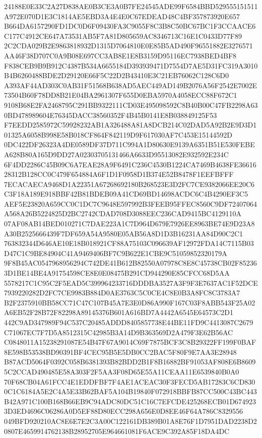 \documentclass[UTF8,fontset=fandol,zihao=-4,a4paper]{ctexart}
\begin{document}
{{24188E0E33C2A27D838AE0B3CE3A0B7FE24545ADE99F6584BBD529555151511A972E070D1E3C1814AE5EBD3A4E4E0C67EDEAD48C4BF357873920E657
B664DA6157290FD1DC0D6F09430FA3C9055F8C3B8C50BC67BC1F3CCAACE6C177C4912CE647A73531AB5F7A81D805659AC8346713C16E1C0433D77F89
2C2CDA029B2E9863818932D1315D7064810E0E85B5AD490F96551882E3276571AA46F38D707C0A9B08E697CC3AB8E1E8B3159D95116EC7938BED4BF8
F838CEB9B9B912C4387B534A6655184D393939471D7554D7AE5D31FC319A3010B4B6260488BDE2D29120E66F5C22D2B43410E3C21EB76062C128C6D0
A393AF44AD303C0AB31F51568B638AD5AEC449AD149B2076A56F2542E7002E73504B60F78DD8B21E04BA2961307F655D0EBA5970A4058ECC88F672C1
9108B68E2FA2468795C291BB9322111CD03E495098592C8B40B00C47FB2298A630BD478989604E76345DACC38560352F4B45B0141E8B038849125F53
F7EEDD2585972C59928232AB1A326488A81A8DCB214C02DAD5A92B2E9D3D101325A6058B998E58B018CF864F842119D9F617030AF7C453E15144592D
0DC422DF26323A4DE0589DF37D711C994A1D80630E9139A6351B51E530FEBEA628B80A165D9DD27A02303705131466A6633D95513082E932592E234C
6F4DD2286C45B09C6A7EAE28A9F6491C236C4530B1224CA7469B4638FE3661628312B128CC0C479F654884A6F1D1F0958D1B374E52B8478F1EEFBFFF
7ECACAECA9468D1A22351A67268692180B268523E3D2FC7CE9382066EE20C6C3F18A189E918BBF42B81BDEB09A41CD69BD14698ACDC6C4B4290EF3C5
AEF5E23820A659CC0C1DC7C9648E597992B3FEEB95FFEC8560C9DF72407064A568A26B5224825D2BC2742CDAD708D3088EEC236CAD9415BC4129110A
07AF08AB14BED010271C7DAE223A1C7D964D679E7926EE8963BE74E9D23A8A30B2525666439F7DF659A54A9580E05AB56A8D1D3B16231AA84D90C2C1
763832344D646AE10E18B018921CF88A75103C096639AF12972FDA14C7115B03D47C1C9BE84904C41A9469406BF7C9B622E1CBE9C51059852320179A
9F8B45AC0547968956294C742DE41B612B82550A07978C8E8C45738CB02F852363D1BE14BE4A91754598CE8E0E08475B291CD944290E85CFCC68D5AA
5578217C1C95C2F5EAD5C399964233716DDDBA3527A3F9F3E7637AC1F52DCE7939220282D2FC7CE9983B884D0AE3763C5C0CE4C8E0B3A8FC8C3783A7
B2F2375910BB58CC71C47C107B45A7E3E0D86A990F167C03F8ABB543F25A02A6EB52F28B72F82298A89145376B601A616BD7A4442A6545E64573C2D1
442C9AD347989F94C537C20485ADDD8405857738E44BE11FD9C4413087C2679C71067EC7F7D5A8512315C42985B3A14D9B363569D2A479F3E62B56AC
C0848011A15238291087E54B47F67A9014C69F7875BCF3C8B29322FF199F0BAF8E598B53538BD90391BF4CEC95B5E5DB0CC2BAC5F80F9E7AA3E28948
B87ACD5064F0392C058B6381393B82BDD2B1F8B16882BF91053AF808E6B86095C2CCAD490485E58A303F2F5AA3F08D65E55A11CEAA11E6539840B0A0
70F68CB04A61FCC4E1EDDFBF7F4AE1ACEAC30F3FECD5AB17283C6CD8300C1C6184A5E2C4A5E33B62BAF5A104B19840F072918BBFB87CC500C43BC443
B42A971C100B168B66EB9C94ADC80DC51C16C7EFCDE425268ECB01D6749233D3ED4696C06286A0D5EF88D80ECC298A656E0D8EE46F64A786C8329556
049BFD920210AC8E6E7E2C3A00C122161DB389B01A8E76F1D7951DAD2238D20807E4659914762138B28952705E964661081F6ACE9C392A85F18DA4DC
}}
\end{document}

